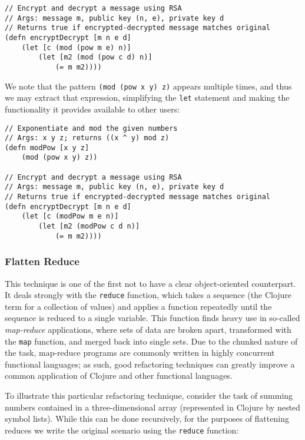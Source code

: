 \documentclass{article}
\begin{document}
\begin{verbatim}
// Encrypt and decrypt a message using RSA
// Args: message m, public key (n, e), private key d
// Returns true if encrypted-decrypted message matches original
(defn encryptDecrypt [m n e d]
    (let [c (mod (pow m e) n)]
        (let [m2 (mod (pow c d) n)]
            (= m m2))))
\end{verbatim}

We note that the pattern \verb!(mod (pow x y) z)! appears multiple times, and thus we may extract that expression, simplifying the \verb!let! statement and making the functionality it provides available to other users:

\begin{verbatim}
// Exponentiate and mod the given numbers
// Args: x y z; returns ((x ^ y) mod z)
(defn modPow [x y z]
    (mod (pow x y) z))

// Encrypt and decrypt a message using RSA
// Args: message m, public key (n, e), private key d
// Returns true if encrypted-decrypted message matches original
(defn encryptDecrypt [m n e d]
    (let [c (modPow m e n)]
        (let [m2 (modPow c d n)]
            (= m m2))))
\end{verbatim}

\subsubsection{Flatten Reduce}

This technique is one of the first not to have a clear object-oriented counterpart. It deals strongly with the \verb!reduce! function, which takes a sequence (the Clojure term for a collection of values) and applies a function repeatedly until the sequence is reduced to a single variable. This function finds heavy use in so-called \textit{map-reduce} applications, where sets of data are broken apart, transformed with the \verb!map! function, and merged back into single sets. Due to the chunked nature of the task, map-reduce programs are commonly written in highly concurrent functional languages; as such, good refactoring techniques can greatly improve a common application of Clojure and other functional languages.

To illustrate this particular refactoring technique, consider the task of summing numbers contained in a three-dimensional array (represented in Clojure by nested symbol lists). While this can be done recursively, for the purposes of flattening reduces we write the original scenario using the \verb!reduce! function:
\end{document}
